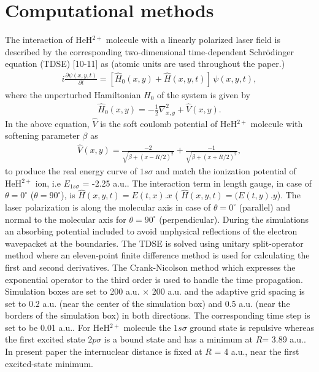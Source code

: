 \documentclass[%
reprint,
twocolumn,
 amsmath,amssymb,
 aps,
pra,
 showpacs
]{revtex4-1}
\begin{document}
\section{Computational methods}
The interaction of HeH$^{2+}$ molecule with a linearly polarized laser field is described by the corresponding two-dimensional time-dependent Schr\"{o}dinger equation (TDSE) [10-11] as (atomic units are used throughout the paper.) 
\begin{eqnarray}\label{eq:11}
  i \frac{\partial \psi(x,y,t)}{\partial t}=[{\widehat {H}_0(x,y)}+\widehat H(x,y,t)]\,\psi(x,y,t),
\end{eqnarray}
where the unperturbed Hamiltonian $H_0$ of the system is given by                               
\begin{eqnarray}\label{eq:12}
\widehat{H}_0(x,y)=-\frac{1}{2}\nabla_{x,y}^2+ \widehat{V}(x,y).
\end{eqnarray}
In the above equation, $\widehat{V}$ is the soft coulomb potential of HeH$^{2+}$ molecule with softening parameter $\beta$ as 
\begin{eqnarray}\label{eq:3}
 \widehat{V}(x,y)= \frac{-2}{\sqrt{\beta+(x-R/2)^2}}+\frac{-1}{\sqrt{\beta+(x+R/2)^2}},
\end{eqnarray}
to produce the real energy curve of ${1s\sigma}$ and match the ionization potential of HeH$^{2+}$ ion, i.e $E_{1s\sigma}$ = -2.25 a.u..
The interaction term in length gauge, in case of $\theta=0^{\circ}$ ($\theta=90^{\circ}$), is $\widehat H(x,y,t)= E(t,x).x$ ( $\widehat H(x,y,t)=(E(t,y).y$). The laser polarization is along the molecular axis in case of $\theta=0^{\circ}$ (parallel) and normal to the molecular axis for $\theta=90^{\circ}$ (perpendicular).
During the simulations an absorbing potential included to avoid unphysical reflections of the electron wavepacket at the boundaries.
The TDSE is solved using unitary split-operator method where an eleven-point finite difference method is used for calculating the first and second derivatives. The Crank-Nicolson method which expresses the exponential operator to the third order is used to handle the time propagation.
Simulation boxes are set to 200 a.u. $\times$ 200 a.u. and the adaptive grid spacing is set to 0.2 a.u. (near the center of the simulation box) and 0.5 a.u. (near the borders of the simulation box) in both directions. The corresponding time step is set to be 0.01 a.u.. For HeH$^{2+}$ molecule the $1s\sigma$ ground state is repulsive whereas the first excited state $2p\sigma$ is a bound state and has a minimum at $R$= 3.89 a.u.. In present paper the internuclear distance is fixed at $R$ = 4 a.u., near the first excited-state minimum.
\end{document}
